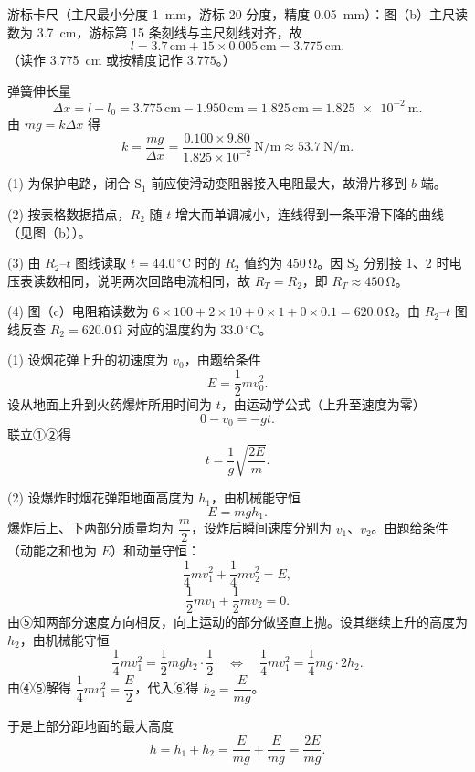 \begin{answer}
游标卡尺（主尺最小分度 \SI{1}{\milli\metre}，游标 20 分度，精度 \SI{0.05}{\milli\metre}）：图（b）主尺读数为 \SI{3.7}{\centi\metre}，游标第 15 条刻线与主尺刻线对齐，故
\[
  l=3.7\,\si{\centi\metre}+15\times0.005\,\si{\centi\metre}=3.775\,\si{\centi\metre}.
\]
（读作 \SI{3.775}{\centi\metre} 或按精度记作 $3.775$。）

弹簧伸长量
\[
  \Delta x=l-l_{0}=3.775\,\si{\centi\metre}-1.950\,\si{\centi\metre}=1.825\,\si{\centi\metre}=\SI{1.825e-2}{\metre}.
\]
由 $mg=k\Delta x$ 得
\[
  k=\frac{mg}{\Delta x}=\frac{0.100\times9.80}{1.825\times10^{-2}}\,\si{\newton\per\metre}\approx\SI{53.7}{\newton\per\metre}.
\]
\end{answer}

\begin{answer}
(1) 为保护电路，闭合 $\mathrm{S}_{1}$ 前应使滑动变阻器接入电阻最大，故滑片移到 $b$ 端。

(2) 按表格数据描点，$R_{2}$ 随 $t$ 增大而单调减小，连线得到一条平滑下降的曲线（见图（b））。

(3) 由 $R_{2}$--$t$ 图线读取 $t=44.0\,^{\circ}\mathrm{C}$ 时的 $R_{2}$ 值约为 $450\,\si{\ohm}$。因 $\mathrm{S}_{2}$ 分别接 1、2 时电压表读数相同，说明两次回路电流相同，故 $R_{T}=R_{2}$，即 $R_{T}\approx450\,\si{\ohm}$。

(4) 图（c）电阻箱读数为 $6\times100+2\times10+0\times1+0\times0.1=620.0\,\si{\ohm}$。由 $R_{2}$--$t$ 图线反查 $R_{2}=620.0\,\si{\ohm}$ 对应的温度约为 $33.0\,^{\circ}\mathrm{C}$。
\end{answer}

\begin{answer}
(1) 设烟花弹上升的初速度为 $v_{0}$，由题给条件
\[
  E=\frac{1}{2}mv_{0}^{2}. \tag{①}
\]
设从地面上升到火药爆炸所用时间为 $t$，由运动学公式（上升至速度为零）
\[
  0-v_{0}=-gt. \tag{②}
\]
联立①②得
\[
  t=\frac{1}{g}\sqrt{\frac{2E}{m}}.
\]

(2) 设爆炸时烟花弹距地面高度为 $h_{1}$，由机械能守恒
\[
  E=mgh_{1}. \tag{③}
\]
爆炸后上、下两部分质量均为 $\dfrac{m}{2}$，设炸后瞬间速度分别为 $v_{1}$、$v_{2}$。由题给条件（动能之和也为 $E$）和动量守恒：
\[
  \frac{1}{4}mv_{1}^{2}+\frac{1}{4}mv_{2}^{2}=E, \tag{④}
\]
\[
  \frac{1}{2}mv_{1}+\frac{1}{2}mv_{2}=0. \tag{⑤}
\]
由⑤知两部分速度方向相反，向上运动的部分做竖直上抛。设其继续上升的高度为 $h_{2}$，由机械能守恒
\[
  \frac{1}{4}mv_{1}^{2}=\frac{1}{2}mg h_{2}\cdot\frac{1}{2}\quad\Longleftrightarrow\quad
  \frac{1}{4}mv_{1}^{2}=\frac{1}{4}mg\cdot 2h_{2}. \tag{⑥}
\]
由④⑤解得 $\dfrac{1}{4}mv_{1}^{2}=\dfrac{E}{2}$，代入⑥得 $h_{2}=\dfrac{E}{mg}$。

于是上部分距地面的最大高度
\[
  h=h_{1}+h_{2}=\frac{E}{mg}+\frac{E}{mg}=\frac{2E}{mg}.
\]
\end{answer}

